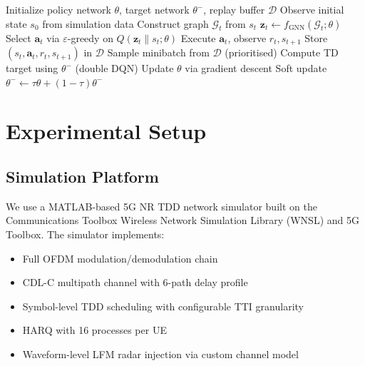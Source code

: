 \documentclass[conference]{IEEEtran}
\begin{document}
\begin{algorithm}[t]
\caption{Hybrid GNN-DQN Training}
\label{alg:training}
\begin{algorithmic}[1]
\STATE Initialize policy network $\theta$, target network $\theta^-$, replay buffer $\mathcal{D}$
    \STATE Observe initial state $s_0$ from simulation data
        \STATE Construct graph $\mathcal{G}_t$ from $s_t$
        \STATE $\mathbf{z}_t \leftarrow f_{\text{GNN}}(\mathcal{G}_t; \theta)$
        \STATE Select $\mathbf{a}_t$ via $\varepsilon$-greedy on $Q(\mathbf{z}_t \| s_t; \theta)$
        \STATE Execute $\mathbf{a}_t$, observe $r_t, s_{t+1}$
        \STATE Store $(s_t, \mathbf{a}_t, r_t, s_{t+1})$ in $\mathcal{D}$
        \STATE Sample minibatch from $\mathcal{D}$ (prioritised)
        \STATE Compute TD target using $\theta^-$ (double DQN)
        \STATE Update $\theta$ via gradient descent
        \STATE Soft update $\theta^- \leftarrow \tau\theta + (1-\tau)\theta^-$
    \ENDFOR
\ENDFOR
\end{algorithmic}
\end{algorithm}

\section{Experimental Setup}

\subsection{Simulation Platform}

We use a MATLAB-based 5G NR TDD network simulator built on the Communications Toolbox Wireless Network Simulation Library (WNSL) and 5G Toolbox. The simulator implements:
\begin{itemize}
    \item Full OFDM modulation/demodulation chain
    \item CDL-C multipath channel with 6-path delay profile
    \item Symbol-level TDD scheduling with configurable TTI granularity
    \item HARQ with 16 processes per UE
    \item Waveform-level LFM radar injection via custom channel model
\end{itemize}
\end{document}
